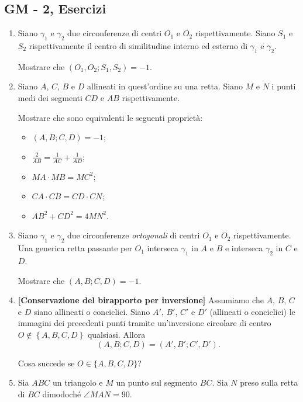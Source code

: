 \subsection{GM - 2, Esercizi}
\begin{enumerate}
	\item Siano $\gamma_1$ e $\gamma_2$ due circonferenze di centri $O_1$ e $O_2$ rispettivamente. Siano $S_1$ e $S_2$ rispettivamente il centro di similitudine interno ed esterno di $\gamma_1$ e $\gamma_2$.
	
	Mostrare che $(O_1,O_2;S_1,S_2)=-1$.
	\item Siano $A$, $C$, $B$ e $D$ allineati in quest'ordine su una retta. Siano $M$ e $N$ i punti medi dei segmenti
	$CD$ e $AB$ rispettivamente. 
	
	Mostrare che sono equivalenti le seguenti proprietà:
	\begin{itemize}
		\item $(A,B;C,D)=-1$;
		\item $\displaystyle\frac{2}{AB}=\displaystyle\frac{1}{AC}+
		\displaystyle\frac{1}{AD}$;
		\item $MA\cdot MB=MC^2$;
		\item $CA\cdot CB=CD\cdot CN$;
		\item $AB^2+CD^2=4MN^2$.
	\end{itemize}
	\item Siano $\gamma_1$ e $\gamma_2$ due circonferenze \textit{ortogonali} di centri $O_1$ e $O_2$ rispettivamente. Una generica retta passante per $O_1$ interseca $\gamma_1$ in $A$ e $B$ e interseca $\gamma_2$ in $C$ e $D$.
	
	Mostrare che $(A,B;C,D)=-1$.
	\item \textbf{[Conservazione del birapporto per inversione]} Assumiamo che $A$, $B$, $C$ e $D$ siano allineati o conciclici. Siano $A'$, $B'$, $C'$ e $D'$ (allineati o conciclici) le immagini dei precedenti punti tramite un'inversione circolare di centro $O\notin\left\{A,B,C,D\right\}$  qualsiasi. Allora
	\begin{equation}
	(A,B;C,D)=(A',B';C',D').
	\end{equation}
	
	Cosa succede se $O\in \{A,B,C,D\}$?
    \item Sia $ABC$ un triangolo e $M$ un punto sul segmento $BC$. Sia $N$ preso sulla retta di $BC$ dimodoché $\angle MAN=90$.
    

\end{enumerate}
